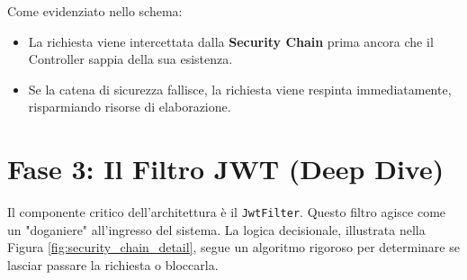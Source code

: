 \documentclass[a4paper,12pt]{report}
\begin{document}
Come evidenziato nello schema:
\begin{itemize}
    \item La richiesta viene intercettata dalla \textbf{Security Chain} prima ancora che il Controller sappia della sua esistenza.
    \item Se la catena di sicurezza fallisce, la richiesta viene respinta immediatamente, risparmiando risorse di elaborazione.
\end{itemize}

\section{Fase 3: Il Filtro JWT (Deep Dive)}
Il componente critico dell'architettura è il \texttt{JwtFilter}. Questo filtro agisce come un "doganiere" all'ingresso del sistema.
La logica decisionale, illustrata nella Figura \ref{fig:security_chain_detail}, segue un algoritmo rigoroso per determinare se lasciar passare la richiesta o bloccarla.
\end{document}

